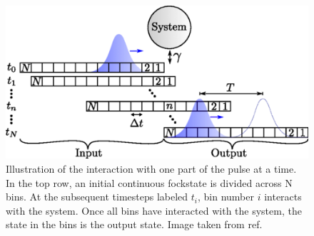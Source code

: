 \begin{figure}
    \centering
    \includegraphics[width = 0.5 \linewidth]{figures/medium (1).png}
    \caption{Illustration of the interaction with one part of the pulse at a time. In the top row, an initial continuous fockstate is divided across N bins. At the subsequent timesteps labeled $t_i$, bin number $i$ interacts with the system. Once all bins have interacted with the system, the state in the bins is the output state. Image taken from ref. \cite{Heuck2020Photon-photonCavities}}
    \label{fig:conveyor}
\end{figure}


